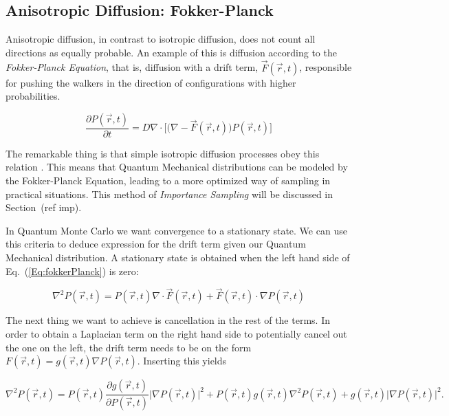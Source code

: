 \subsection{Anisotropic Diffusion: Fokker-Planck}

Anisotropic diffusion, in contrast to isotropic diffusion, does not count all directions as equally probable. An example of this is diffusion according to the \textit{Fokker-Planck Equation}, that is, diffusion with a drift term, $\vec F(\vec r, t)$, responsible for pushing the walkers in the direction of configurations with higher probabilities.

\begin{equation}
 \label{Eq:fokkerPlanck}
 \frac{\partial P(\vec r, t)}{\partial t} = D\nabla\cdot\Big[\Big(\nabla - \vec F(\vec r, t)\Big) P(\vec r, t)\Big] 
\end{equation}

The remarkable thing is that simple isotropic diffusion processes obey this relation \cite{abInitioMC}. This means that Quantum Mechanical distributions can be modeled by the Fokker-Planck Equation, leading to a more optimized way of sampling in practical situations. This method of \textit{Importance Sampling} will be discussed in Section~(ref imp). 

In Quantum Monte Carlo we want convergence to a stationary state. We can use this criteria to deduce expression for the drift term given our Quantum Mechanical distribution. A stationary state is obtained when the left hand side of Eq.~(\ref{Eq:fokkerPlanck}) is zero:

\begin{equation*}
 \nabla^2 P(\vec r, t) = P(\vec r, t)\nabla\cdot\vec F(\vec r, t) + \vec F(\vec r, t) \cdot \nabla P(\vec r, t)
\end{equation*}

The next thing we want to achieve is cancellation in the rest of the terms. In order to obtain a Laplacian term on the right hand side to potentially cancel out the one on the left, the drift term needs to be on the form $F(\vec r, t) = g(\vec r, t)\nabla P(\vec r, t)$. Inserting this yields

\begin{equation*}
  \nabla^2 P(\vec r, t) = P(\vec r, t)\frac{\partial g(\vec r, t)}{\partial P(\vec r, t)}\Big|\nabla P(\vec r, t)\Big|^2
  + P(\vec r, t)g(\vec r, t)\nabla^2 P(\vec r, t) + g(\vec r, t) \Big|\nabla P(\vec r, t)\Big|^2.
\end{equation*}

